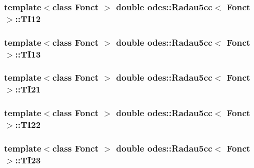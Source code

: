 \hypertarget{classodes_1_1Radau5cc_aaed25bf9d94e2cbbbeed75c093c0406f}{
\subsubsection[{T\-I12}]{\setlength{\rightskip}{0pt plus 5cm}template$<$class Fonct $>$ double {\bf odes\-::\-Radau5cc}$<$ Fonct $>$\-::T\-I12\hspace{0.3cm}{\ttfamily [private]}}}\label{classodes_1_1Radau5cc_aaed25bf9d94e2cbbbeed75c093c0406f}
\hypertarget{classodes_1_1Radau5cc_a6da247a0623462bb1d61e5c97d67a39f}{
\subsubsection[{T\-I13}]{\setlength{\rightskip}{0pt plus 5cm}template$<$class Fonct $>$ double {\bf odes\-::\-Radau5cc}$<$ Fonct $>$\-::T\-I13\hspace{0.3cm}{\ttfamily [private]}}}\label{classodes_1_1Radau5cc_a6da247a0623462bb1d61e5c97d67a39f}
\hypertarget{classodes_1_1Radau5cc_a14b80d1886a7562f3a72ce7acd738272}{
\subsubsection[{T\-I21}]{\setlength{\rightskip}{0pt plus 5cm}template$<$class Fonct $>$ double {\bf odes\-::\-Radau5cc}$<$ Fonct $>$\-::T\-I21\hspace{0.3cm}{\ttfamily [private]}}}\label{classodes_1_1Radau5cc_a14b80d1886a7562f3a72ce7acd738272}
\hypertarget{classodes_1_1Radau5cc_a77584ef2a5a6cccef4fe531e95c800d7}{
\subsubsection[{T\-I22}]{\setlength{\rightskip}{0pt plus 5cm}template$<$class Fonct $>$ double {\bf odes\-::\-Radau5cc}$<$ Fonct $>$\-::T\-I22\hspace{0.3cm}{\ttfamily [private]}}}\label{classodes_1_1Radau5cc_a77584ef2a5a6cccef4fe531e95c800d7}
\hypertarget{classodes_1_1Radau5cc_aafd01d1393c2dbe3edc148f073bf24f6}{
\subsubsection[{T\-I23}]{\setlength{\rightskip}{0pt plus 5cm}template$<$class Fonct $>$ double {\bf odes\-::\-Radau5cc}$<$ Fonct $>$\-::T\-I23\hspace{0.3cm}{\ttfamily [private]}}}\label{classodes_1_1Radau5cc_aafd01d1393c2dbe3edc148f073bf24f6}
